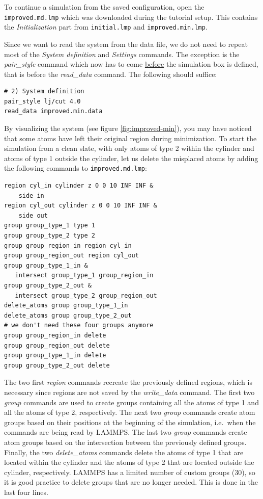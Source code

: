\documentclass[9pt,tutorial]{livecoms}
\renewcommand{\emph}[1]{\underline{#1}} %
\newcommand{\flecmd}[1]{\textcolor{command}{\texttt{#1}}} %
\begin{document}
To continue a simulation from the saved configuration, open the
\flecmd{improved.md.lmp} which was downloaded during the tutorial setup.
This contains the \textit{Initialization} part from \flecmd{initial.lmp}
and \flecmd{improved.min.lmp}.

Since we want to read the system from the data file, we do not need
to repeat most of the \textit{System definition} and \textit{Settings}
commands.  The exception is the \textit{pair\_style} command which now
has to come \emph{before} the simulation box is defined, that is before
the \textit{read\_data} command.  The following should suffice:
\begin{lstlisting}
# 2) System definition
pair_style lj/cut 4.0
read_data improved.min.data
\end{lstlisting}

By visualizing the system (see figure \ref{fig:improved-min}), you may
have noticed that some atoms have left their original region during
minimization.  To start the simulation from a clean slate, with only
atoms of type 2 within the cylinder and atoms of type 1 outside the
cylinder, let us delete the misplaced atoms by adding the following
commands to \flecmd{improved.md.lmp}:

\begin{lstlisting}
region cyl_in cylinder z 0 0 10 INF INF &
    side in
region cyl_out cylinder z 0 0 10 INF INF &
    side out
group group_type_1 type 1
group group_type_2 type 2
group group_region_in region cyl_in
group group_region_out region cyl_out
group group_type_1_in &
   intersect group_type_1 group_region_in
group group_type_2_out &
   intersect group_type_2 group_region_out
delete_atoms group group_type_1_in
delete_atoms group group_type_2_out
# we don't need these four groups anymore
group group_region_in delete
group group_region_out delete
group group_type_1_in delete
group group_type_2_out delete
\end{lstlisting}

The two first \textit{region} commands recreate the previously defined
regions, which is necessary since regions are not saved by the
\textit{write\_data} command.  The first two \textit{group} commands are
used to create groups containing all the atoms of type 1 and all the
atoms of type 2, respectively.  The next two \textit{group} commands
create atom groups based on their positions at the beginning of the
simulation, i.e.~when the commands are being read by LAMMPS.  The last
two \textit{group} commands create atom groups based on the intersection
between the previously defined groups.  Finally, the two
\textit{delete\_atoms} commands delete the atoms of type 1 that are
located within the cylinder and the atoms of type 2 that are located
outside the cylinder, respectively.  LAMMPS has a limited number of
custom groups (30), so it is good practice to delete groups that are no
longer needed.  This is done in the last four lines.
\end{document}
